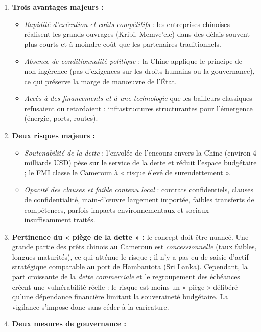 \documentclass[11pt]{article}
\begin{document}
\begin{corrige}
\begin{enumerate}
    \item \textbf{Trois avantages majeurs :}
    \begin{itemize}
        \item \emph{Rapidité d'exécution et coûts compétitifs} : les entreprises chinoises réalisent les grands ouvrages (Kribi, Memve'ele) dans des délais souvent plus courts et à moindre coût que les partenaires traditionnels.
        \item \emph{Absence de conditionnalité politique} : la Chine applique le principe de non-ingérence (pas d'exigences sur les droits humains ou la gouvernance), ce qui préserve la marge de manœuvre de l'État.
        \item \emph{Accès à des financements et à une technologie} que les bailleurs classiques refusaient ou retardaient : infrastructures structurantes pour l'émergence (énergie, ports, routes).
    \end{itemize}
    \item \textbf{Deux risques majeurs :}
    \begin{itemize}
        \item \emph{Soutenabilité de la dette} : l'envolée de l'encours envers la Chine (environ 4 milliards USD) pèse sur le service de la dette et réduit l'espace budgétaire ; le FMI classe le Cameroun à « risque élevé de surendettement ».
        \item \emph{Opacité des clauses et faible contenu local} : contrats confidentiels, clauses de confidentialité, main-d'œuvre largement importée, faibles transferts de compétences, parfois impacts environnementaux et sociaux insuffisamment traités.
    \end{itemize}
    \item \textbf{Pertinence du « piège de la dette » :} le concept doit être nuancé. Une grande partie des prêts chinois au Cameroun est \emph{concessionnelle} (taux faibles, longues maturités), ce qui atténue le risque ; il n'y a pas eu de saisie d'actif stratégique comparable au port de Hambantota (Sri Lanka). Cependant, la part croissante de la \emph{dette commerciale} et le regroupement des échéances créent une vulnérabilité réelle : le risque est moins un « piège » délibéré qu'une dépendance financière limitant la souveraineté budgétaire. La vigilance s'impose donc sans céder à la caricature.
    \item \textbf{Deux mesures de gouvernance :}

\end{enumerate}
\end{corrige}
\end{document}
